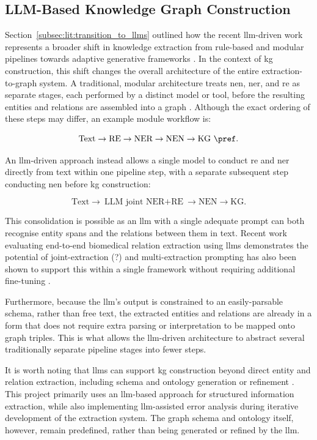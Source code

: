 \subsection{LLM-Based Knowledge Graph Construction}
\label{subsec:lit:llm_based_kg_construction}
Section~\ref{subsec:lit:transition_to_llms} outlined how the recent \gls{llm}-driven work represents a broader shift in knowledge extraction from rule-based and modular pipelines towards adaptive generative frameworks \cite{bian2025_llm_automation_shift}. In the context of \gls{kg} construction, this shift changes the overall architecture of the entire extraction-to-graph system. A traditional, modular architecture treats \gls{nen}, \gls{ner}, and \gls{re} as separate stages, each performed by a distinct model or tool, before the resulting entities and relations are assembled into a graph \pref. Although the exact ordering of these steps may differ, an example module workflow is:

\[
\text{Text} \rightarrow \text{RE} \rightarrow \text{NER} \rightarrow \text{NEN} \rightarrow \text{KG} \ \pref.
\]

An \gls{llm}-driven approach instead allows a single model to conduct \gls{re} and \gls{ner} directly from text within one pipeline step, with a separate subsequent step conducting \gls{nen} before \gls{kg} construction:

\[
\text{Text} \rightarrow \boxed{\text{LLM joint NER} + \text{RE}} \rightarrow \text{NEN} \rightarrow \text{KG}.
\]

This consolidation is possible as an \gls{llm} with a single adequate prompt can both recognise entity spans and the relations between them in text. Recent work evaluating end-to-end biomedical relation extraction using \glspl{llm} demonstrates the potential of joint-extraction \cite{brokman2025benchmark} (?) and multi-extraction prompting has also been shown to support this within a single framework without requiring additional fine-tuning \cite{labonte2026structured}.

Furthermore, because the \gls{llm}'s output is constrained to an easily-parsable schema, rather than free text, the extracted entities and relations are already in a form that does not require extra parsing or interpretation to be mapped onto graph triples. This is what allows the \gls{llm}-driven architecture to abstract several traditionally separate pipeline stages into fewer steps.

It is worth noting that \glspl{llm} can support \gls{kg} construction beyond direct entity and relation extraction, including schema and ontology generation or refinement \cite{bian2025_llm_automation_shift} \pref. This project primarily uses an \gls{llm}-based approach for structured information extraction, while also implementing \gls{llm}-assisted error analysis during iterative development of the extraction system. The graph schema and ontology itself, however, remain predefined, rather than being generated or refined by the \gls{llm}.

